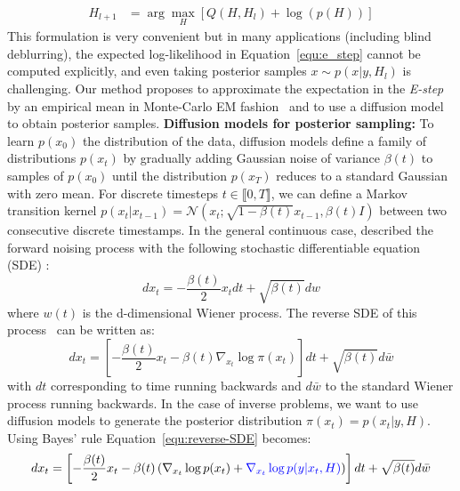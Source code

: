 \documentclass[10pt,twocolumn,letterpaper]{article}
\begin{document}
\begin{align}
\label{equ:m_step}
    H_{l+1} &= \arg\max_H \left[Q(H,H_l) + \log(p(H))\right]
\end{align}
%
This formulation is very convenient but in many applications (including blind deblurring), the expected log-likelihood in Equation~\eqref{equ:e_step} cannot be computed explicitly, and even taking posterior samples $x \sim p(x|y,H_l)$ is challenging.
%
Our method proposes to approximate the expectation in the \textit{E-step} by an empirical mean in Monte-Carlo EM fashion~\cite{Wei1990AMC} and to use a diffusion model to obtain posterior samples.
%
\newline
\newline
%
\textbf{Diffusion models for posterior sampling:} To learn $p(x_0)$ the distribution of the data, diffusion models define a family of distributions $p(x_t)$ by gradually adding Gaussian noise of variance $\beta(t)$ to samples of $p(x_0)$ until the distribution $p(x_T)$ reduces to a standard Gaussian with zero mean. 
%
For discrete timesteps $t \in \llbracket 0, T \rrbracket$, we can define a Markov transition kernel $p(x_t|x_{t-1}) = \mathcal{N}(x_t; \sqrt{1-\beta(t)}x_{t-1}, \beta(t) I)$ between two consecutive discrete timestamps.
%
In the general continuous case, \cite{song_score-based_2021} described the forward noising process with the following stochastic differentiable equation (SDE) :
%
\begin{equation}
    d{x_t} = -\frac{\beta(t)}{2} {x_t} dt + \sqrt{\beta(t)}dw 
\end{equation}
%
where $w(t)$ is the d-dimensional Wiener process. The reverse SDE of this process~\cite{anderson_reverse-time_1982} can be written as:
%
\begin{equation}
\label{equ:reverse-SDE}
    d{x_t} = [-\frac{\beta(t)}{2}{x_t} - \beta(t)\nabla_{{x_t}} \log \pi({x_t}) ]dt + \sqrt{\beta(t)}d\bar{w}
\end{equation}
%
with $dt$ corresponding to time running backwards and $d\bar{w}$ to the standard Wiener process running backwards. 
%
In the case of inverse problems, we want to use diffusion models to generate the posterior distribution $\pi(x_t) = p({x_t}|y, H)$. Using Bayes' rule Equation~\eqref{equ:reverse-SDE} becomes:
%
\begin{dmath}
\label{equ:reverse-SDE-inv-pbm}
    d{x_t} =  \left[-\frac{\beta(t)}{2}{x_t} - \beta(t)\left(\nabla_{{x_t}} \log p({x_t}) + \textcolor{blue}{\nabla_{{x_t}} \log p(y|{x_t}, H)}\right) \right]dt + \sqrt{\beta(t)}d\bar{w}
\end{dmath}
\end{document}
